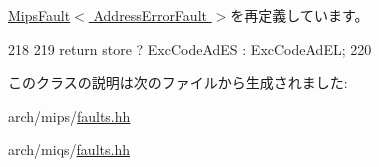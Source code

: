 \hyperlink{classMipsISA_1_1MipsFault_a1dd20a2460d7723d3eaa287b7cc07e79}{MipsFault$<$ AddressErrorFault $>$}を再定義しています。


\begin{DoxyCode}
218     {
219         return store ? ExcCodeAdES : ExcCodeAdEL;
220     }
\end{DoxyCode}


このクラスの説明は次のファイルから生成されました:\begin{DoxyCompactItemize}
\item 
arch/mips/\hyperlink{arch_2mips_2faults_8hh}{faults.hh}\item 
arch/miqs/\hyperlink{arch_2miqs_2faults_8hh}{faults.hh}\end{DoxyCompactItemize}
